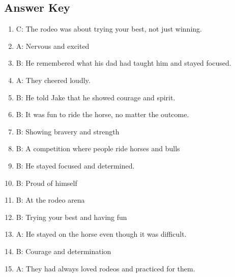 \documentclass[12pt]{article}
\begin{document}
\subsection*{Answer Key}

\begin{enumerate}

    \item C: The rodeo was about trying your best, not just winning.

    \item A: Nervous and excited

    \item B: He remembered what his dad had taught him and stayed focused.

    \item A: They cheered loudly.

    \item B: He told Jake that he showed courage and spirit.

    \item B: It was fun to ride the horse, no matter the outcome.

    \item B: Showing bravery and strength

    \item B: A competition where people ride horses and bulls

    \item B: He stayed focused and determined.

    \item B: Proud of himself

    \item B: At the rodeo arena

    \item B: Trying your best and having fun

    \item A: He stayed on the horse even though it was difficult.

    \item B: Courage and determination

    \item A: They had always loved rodeos and practiced for them.

\end{enumerate}
\end{document}
